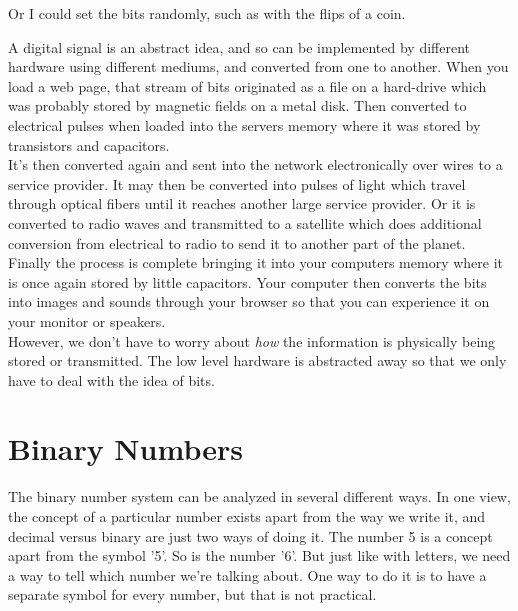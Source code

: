 \begin{center}\end{center}

Or I could set the bits randomly, such as with the flips of a coin.

\begin{center}\end{center}

A digital signal is an abstract idea, and so can be implemented by different hardware using different mediums, and converted from one to another. When you load a web page, that stream of bits originated as a file on a hard-drive which was probably stored by magnetic fields on a metal disk. Then converted to electrical pulses when loaded into the servers memory where it was stored by transistors and capacitors.\\

It's then converted again and sent into the network electronically over wires to a service provider. It may then be converted into pulses of light which travel through optical fibers until it reaches another large service provider. Or it is converted to radio waves and transmitted to a satellite which does additional conversion from electrical to radio to send it to another part of the planet. Finally the process is complete bringing it into your computers memory where it is once again stored by little capacitors. Your computer then converts the bits into images and sounds through your browser so that you can experience it on your monitor or speakers.\\

However, we don't have to worry about \textit{how} the information is physically being stored or transmitted. The low level hardware is abstracted away so that we only have to deal with the idea of bits.

\section{Binary Numbers}

The binary number system can be analyzed in several different ways. In one view, the concept of a particular number exists apart from the way we write it, and decimal versus binary are just two ways of doing it. The number 5 is a concept apart from the symbol '5'. So is the number '6'. But just like with letters, we need a way to tell which number we're talking about. One way to do it is to have a separate symbol for every number, but that is not practical.\\

